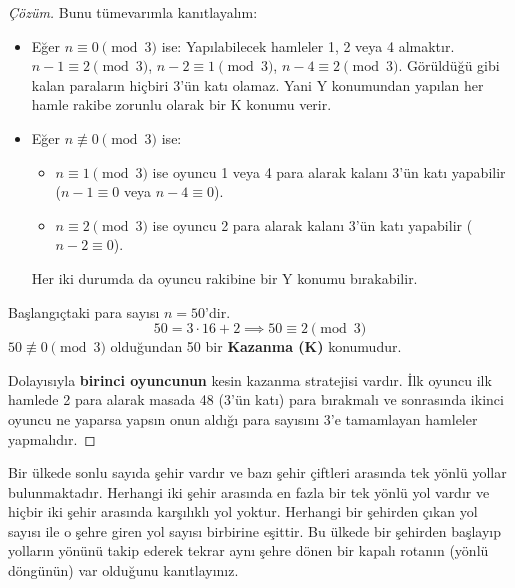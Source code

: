 \begin{proof}[Çözüm]
Bunu tümevarımla kanıtlayalım:
\begin{itemize}
    \item Eğer $n \equiv 0 \pmod 3$ ise: Yapılabilecek hamleler 1, 2 veya 4 almaktır.
    $n - 1 \equiv 2 \pmod 3$, $n - 2 \equiv 1 \pmod 3$, $n - 4 \equiv 2 \pmod 3$. 
    Görüldüğü gibi kalan paraların hiçbiri 3'ün katı olamaz. Yani Y konumundan yapılan her hamle rakibe zorunlu olarak bir K konumu verir.
    \item Eğer $n \not\equiv 0 \pmod 3$ ise: 
    \begin{itemize}
        \item $n \equiv 1 \pmod 3$ ise oyuncu 1 veya 4 para alarak kalanı 3'ün katı yapabilir ($n - 1 \equiv 0$ veya $n - 4 \equiv 0$).
        \item $n \equiv 2 \pmod 3$ ise oyuncu 2 para alarak kalanı 3'ün katı yapabilir ($n - 2 \equiv 0$).
    \end{itemize}
    Her iki durumda da oyuncu rakibine bir Y konumu bırakabilir.
\end{itemize}

Başlangıçtaki para sayısı $n = 50$'dir.
\[
50 = 3 \cdot 16 + 2 \implies 50 \equiv 2 \pmod 3
\]
$50 \not\equiv 0 \pmod 3$ olduğundan 50 bir \textbf{Kazanma (K)} konumudur. 

Dolayısıyla \textbf{birinci oyuncunun} kesin kazanma stratejisi vardır. İlk oyuncu ilk hamlede 2 para alarak masada 48 ($3$'ün katı) para bırakmalı ve sonrasında ikinci oyuncu ne yaparsa yapsın onun aldığı para sayısını 3'e tamamlayan hamleler yapmalıdır.
\end{proof}

\begin{example}
Bir ülkede sonlu sayıda şehir vardır ve bazı şehir çiftleri arasında tek yönlü yollar bulunmaktadır. Herhangi iki şehir arasında en fazla bir tek yönlü yol vardır ve hiçbir iki şehir arasında karşılıklı yol yoktur. Herhangi bir şehirden çıkan yol sayısı ile o şehre giren yol sayısı birbirine eşittir. Bu ülkede bir şehirden başlayıp yolların yönünü takip ederek tekrar aynı şehre dönen bir kapalı rotanın (yönlü döngünün) var olduğunu kanıtlayınız.
\end{example}

